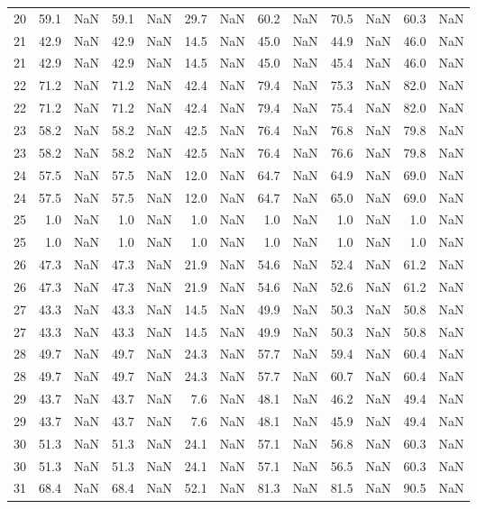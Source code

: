 \begin{tabular}{lrrrrrrrrrrrr}
20 & 59.1 & NaN & 59.1 & NaN & 29.7 & NaN & 60.2 & NaN & 70.5 & NaN & 60.3 & NaN \\
21 & 42.9 & NaN & 42.9 & NaN & 14.5 & NaN & 45.0 & NaN & 44.9 & NaN & 46.0 & NaN \\
21 & 42.9 & NaN & 42.9 & NaN & 14.5 & NaN & 45.0 & NaN & 45.4 & NaN & 46.0 & NaN \\
22 & 71.2 & NaN & 71.2 & NaN & 42.4 & NaN & 79.4 & NaN & 75.3 & NaN & 82.0 & NaN \\
22 & 71.2 & NaN & 71.2 & NaN & 42.4 & NaN & 79.4 & NaN & 75.4 & NaN & 82.0 & NaN \\
23 & 58.2 & NaN & 58.2 & NaN & 42.5 & NaN & 76.4 & NaN & 76.8 & NaN & 79.8 & NaN \\
23 & 58.2 & NaN & 58.2 & NaN & 42.5 & NaN & 76.4 & NaN & 76.6 & NaN & 79.8 & NaN \\
24 & 57.5 & NaN & 57.5 & NaN & 12.0 & NaN & 64.7 & NaN & 64.9 & NaN & 69.0 & NaN \\
24 & 57.5 & NaN & 57.5 & NaN & 12.0 & NaN & 64.7 & NaN & 65.0 & NaN & 69.0 & NaN \\
25 & 1.0 & NaN & 1.0 & NaN & 1.0 & NaN & 1.0 & NaN & 1.0 & NaN & 1.0 & NaN \\
25 & 1.0 & NaN & 1.0 & NaN & 1.0 & NaN & 1.0 & NaN & 1.0 & NaN & 1.0 & NaN \\
26 & 47.3 & NaN & 47.3 & NaN & 21.9 & NaN & 54.6 & NaN & 52.4 & NaN & 61.2 & NaN \\
26 & 47.3 & NaN & 47.3 & NaN & 21.9 & NaN & 54.6 & NaN & 52.6 & NaN & 61.2 & NaN \\
27 & 43.3 & NaN & 43.3 & NaN & 14.5 & NaN & 49.9 & NaN & 50.3 & NaN & 50.8 & NaN \\
27 & 43.3 & NaN & 43.3 & NaN & 14.5 & NaN & 49.9 & NaN & 50.3 & NaN & 50.8 & NaN \\
28 & 49.7 & NaN & 49.7 & NaN & 24.3 & NaN & 57.7 & NaN & 59.4 & NaN & 60.4 & NaN \\
28 & 49.7 & NaN & 49.7 & NaN & 24.3 & NaN & 57.7 & NaN & 60.7 & NaN & 60.4 & NaN \\
29 & 43.7 & NaN & 43.7 & NaN & 7.6 & NaN & 48.1 & NaN & 46.2 & NaN & 49.4 & NaN \\
29 & 43.7 & NaN & 43.7 & NaN & 7.6 & NaN & 48.1 & NaN & 45.9 & NaN & 49.4 & NaN \\
30 & 51.3 & NaN & 51.3 & NaN & 24.1 & NaN & 57.1 & NaN & 56.8 & NaN & 60.3 & NaN \\
30 & 51.3 & NaN & 51.3 & NaN & 24.1 & NaN & 57.1 & NaN & 56.5 & NaN & 60.3 & NaN \\
31 & 68.4 & NaN & 68.4 & NaN & 52.1 & NaN & 81.3 & NaN & 81.5 & NaN & 90.5 & NaN \\

\end{tabular}
